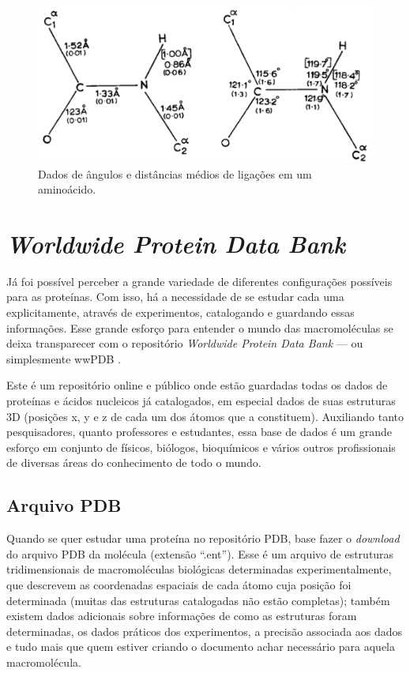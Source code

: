 \begin{figure}[H]
	\begin{center}
		\includegraphics[width=0.8\linewidth]{secProteins/figures/rama.png}
	\end{center}
	\caption{Dados de ângulos e distâncias médios de ligações em um aminoácido.}
	\label{fig:rama}
\end{figure}


\section*{\textit{Worldwide Protein Data Bank}}
Já foi possível perceber a grande variedade de diferentes configurações possíveis para as proteínas. Com isso, há a necessidade de se estudar cada uma explicitamente, através de experimentos, catalogando e guardando essas informações. Esse grande esforço para entender o mundo das macromoléculas se deixa transparecer com o repositório \textit{Worldwide Protein Data Bank} --- ou simplesmente wwPDB \cite{wwPDB}.

Este é um repositório online e público onde estão guardadas todas os dados de proteínas e ácidos nucleicos já catalogados, em especial dados de suas estruturas 3D (posições x, y e z de cada um dos átomos que a constituem). Auxiliando tanto pesquisadores, quanto professores e estudantes, essa base de dados é um grande esforço em conjunto de físicos, biólogos, bioquímicos e vários outros profissionais de diversas áreas do conhecimento de todo o mundo.

\subsection*{Arquivo PDB\label{sec:pdb}}
Quando se quer estudar uma proteína no repositório PDB, base fazer o \textit{download} do arquivo PDB da molécula (extensão ``.ent''). Esse é um arquivo de estruturas tridimensionais de macromoléculas biológicas determinadas experimentalmente, que descrevem as coordenadas espaciais de cada átomo cuja posição foi determinada (muitas das estruturas catalogadas não estão completas); também existem dados adicionais sobre informações de como as estruturas foram determinadas, os dados práticos dos experimentos, a precisão associada aos dados e tudo mais que quem estiver criando o documento achar necessário para aquela macromolécula.

